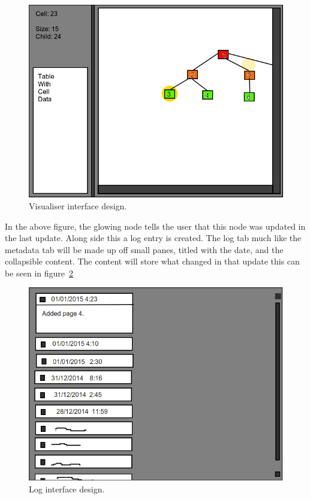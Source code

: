\begin{figure}[H]
	\centering
	\includegraphics[scale=0.32]{images/ui_visuliser.png}
	\caption{Visualiser interface design.}
	\label{fig:des_ui_vis}
\end{figure}

In the above figure, the glowing node tells the user that this node was updated in the last update. Along side this a log entry is created. The log tab much like the metadata tab will be made up off small panes, titled with the date, and the collapsible content. The content will store what changed in that update this can be seen in figure~\ref{fig:des_ui_log}

\begin{figure}[H]
	\centering
	\includegraphics[scale=0.32]{images/ui_log.png}
	\caption{Log interface design.}
	\label{fig:des_ui_log}
\end{figure}

